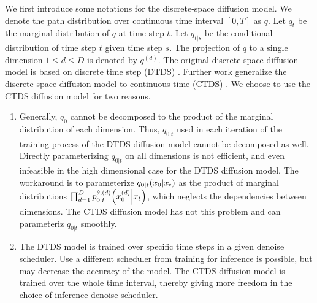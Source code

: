 \documentclass{article}
\begin{document}
We first introduce some notations for the discrete-space diffusion model. We denote the path distribution over continuous time interval $[0, T]$ as $q$. Let $q_t$ be the marginal distribution of $q$ at time step $t$. Let $q_{t|s}$ be the conditional distribution of time step $t$ given time step $s$. The projection of $q$ to a single dimension $1\le d\le D$ is denoted by $q^{(d)}$. The original discrete-space diffusion model is based on discrete time step (DTDS) \cite{austin2021structured}. Further work generalize the discrete-space diffusion model to continuous time (CTDS) \cite{campbell2022continuous,zhao2024unified}. We choose to use the CTDS diffusion model for two reasons.
\begin{enumerate}
  \item Generally, $q_0$ cannot be decomposed to the product of the marginal distribution of each dimension. Thus, $q_{0|t}$ used in each iteration of the training process of the DTDS diffusion model cannot be decomposed as well. Directly parameterizing $q_{0|t}$ on all dimensions is not efficient, and even infeasible in the high dimensional case for the DTDS diffusion model. The workaround is to parameterize $q_{0|t}\qty(x_0|x_t)$ as the product of marginal distributions $\prod_{d=1}^D p^{\theta,(d)}_{0|t}\qty(x_0^{(d)}\middle|x_t)$, which neglects the dependencies between dimensions. The CTDS diffusion model has not this problem and can parameteriz $q_{0|t}$ smoothly.

  \item The DTDS model is trained over specific time steps in a given denoise scheduler. Use a different scheduler from training for inference is possible, but may decrease the accuracy of the model. The CTDS diffusion model is trained over the whole time interval, thereby giving more freedom in the choice of inference denoise scheduler.
\end{enumerate}
\end{document}
